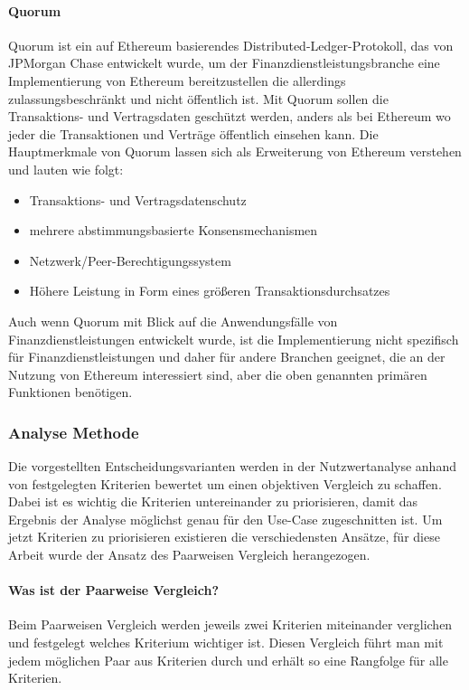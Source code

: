 \paragraph{Quorum}
Quorum ist ein auf Ethereum basierendes Distributed-Ledger-Protokoll, das von JPMorgan Chase entwickelt wurde, um der Finanzdienstleistungsbranche eine Implementierung von Ethereum bereitzustellen die allerdings zulassungsbeschränkt und nicht öffentlich ist. Mit Quorum sollen die Transaktions- und Vertragsdaten geschützt werden, anders als bei Ethereum wo jeder die Transaktionen und Verträge öffentlich einsehen kann. Die Hauptmerkmale von Quorum lassen sich als Erweiterung von Ethereum verstehen und lauten wie folgt:

\begin{itemize}
	\item Transaktions- und Vertragsdatenschutz
	\item mehrere abstimmungsbasierte Konsensmechanismen
	\item Netzwerk/Peer-Berechtigungssystem
	\item Höhere Leistung in Form eines größeren Transaktionsdurchsatzes
\end{itemize}

Auch wenn Quorum mit Blick auf die Anwendungsfälle von Finanzdienstleistungen entwickelt wurde, ist die Implementierung nicht spezifisch für Finanzdienstleistungen und daher für andere Branchen geeignet, die an der Nutzung von Ethereum interessiert sind, aber die oben genannten primären Funktionen benötigen.

\subsubsection{Analyse Methode}
Die vorgestellten Entscheidungsvarianten werden in der Nutzwertanalyse anhand von festgelegten Kriterien bewertet um einen objektiven Vergleich zu schaffen. Dabei ist es wichtig die Kriterien untereinander zu priorisieren, damit das Ergebnis der Analyse möglichst genau für den Use-Case zugeschnitten ist. Um jetzt Kriterien zu priorisieren existieren die verschiedensten Ansätze, für diese Arbeit wurde der Ansatz des Paarweisen Vergleich herangezogen.

\paragraph{Was ist der Paarweise Vergleich?}
Beim Paarweisen Vergleich werden jeweils zwei Kriterien miteinander verglichen und festgelegt welches Kriterium wichtiger ist. Diesen Vergleich führt man mit jedem möglichen Paar aus Kriterien durch und erhält so eine Rangfolge für alle Kriterien.

